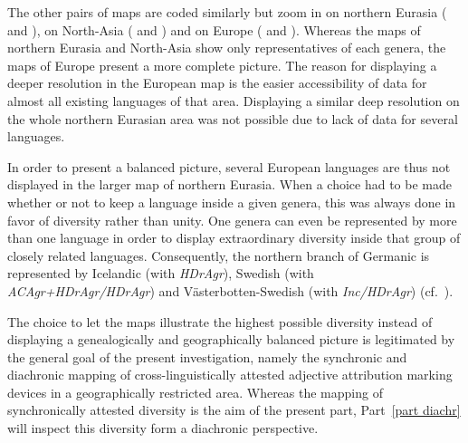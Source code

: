The other pairs of maps are coded similarly but zoom in on northern Eurasia ( and ), on North-Asia ( and ) and on Europe ( and ). Whereas the maps of northern Eurasia and North-Asia show only representatives of each genera, the maps of Europe present a more complete picture. The reason for displaying a deeper resolution in the European map is the easier accessibility of data for almost all existing languages of that area. Displaying a similar deep resolution on the whole northern Eurasian area was not possible due to lack of data for several languages.

In order to present a balanced picture, several European languages are thus not displayed in the larger map of northern Eurasia. When a choice had to be made whether or not to keep a language inside a given genera, this was always done in favor of diversity rather than unity. One genera can even be represented by more than one language in order to display extraordinary diversity inside that group of closely related languages. Consequently, the northern branch of Germanic is represented by Icelandic (with \textit{HDrAgr}), Swedish (with \textit{ACAgr+HDrAgr/HDrAgr}) and Västerbotten-Swedish (with \textit{Inc/HDrAgr}) (cf.~).

The choice to let the maps illustrate the highest possible diversity instead of displaying a genealogically and geographically balanced picture is legitimated by the general goal of the present investigation, namely the synchronic and diachronic mapping of cross-linguistically attested adjective attribution marking devices in a geographically restricted area. Whereas the mapping of synchronically attested diversity is the aim of the present part, Part~\ref{part diachr} will inspect this diversity form a diachronic perspective.
